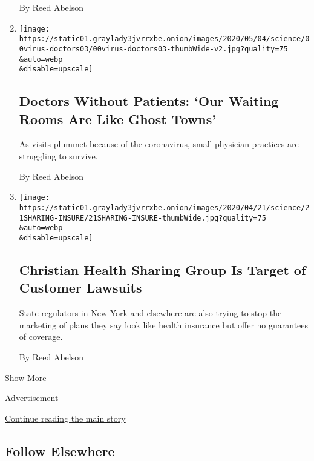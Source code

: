 \begin{enumerate}
  By Reed Abelson
\item
  \href{/2020/05/05/health/coronavirus-primary-care-doctor.html}{}

  \texttt{[image: https://static01.graylady3jvrrxbe.onion/images/2020/05/04/science/00virus-doctors03/00virus-doctors03-thumbWide-v2.jpg?quality=75\\\&auto=webp\\\&disable=upscale]}

  \hypertarget{doctors-without-patients-our-waiting-rooms-are-like-ghost-towns}{%
  \subsection{Doctors Without Patients: `Our Waiting Rooms Are Like
  Ghost
  Towns'}\label{doctors-without-patients-our-waiting-rooms-are-like-ghost-towns}}

  As visits plummet because of the coronavirus, small physician
  practices are struggling to survive.

  By Reed Abelson
\item
  \href{/2020/04/21/health/christian-ministries-insurance-lawsuits.html}{}

  \texttt{[image: https://static01.graylady3jvrrxbe.onion/images/2020/04/21/science/21SHARING-INSURE/21SHARING-INSURE-thumbWide.jpg?quality=75\\\&auto=webp\\\&disable=upscale]}

  \hypertarget{christian-health-sharing-group-is-target-of-customer-lawsuits}{%
  \subsection{Christian Health Sharing Group Is Target of Customer
  Lawsuits}\label{christian-health-sharing-group-is-target-of-customer-lawsuits}}

  State regulators in New York and elsewhere are also trying to stop the
  marketing of plans they say look like health insurance but offer no
  guarantees of coverage.

  By Reed Abelson
\end{enumerate}

Show More

Advertisement

\protect\hyperlink{after-mid2}{Continue reading the main story}

\hypertarget{follow-elsewhere}{%
\subsection{Follow Elsewhere}\label{follow-elsewhere}}

